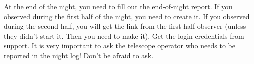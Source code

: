 At the \href{http://www.ctio.noao.edu/noao/content/End-Night-2}{end of the night}, you need to fill out the \href{http://www.ctio.noao.edu/noao/node/add/night-report}{end-of-night report}. If you observed during the first half of the night, you need to create it. If you observed during the second half, you will get the link from the first half observer (unless they didn't start it. Then you need to make it). Get the login credentials from support. It is very important to ask the telescope operator who needs to be reported in the night log! Don't be afraid to ask.\\

